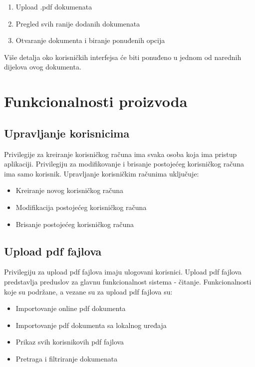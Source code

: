 \begin{enumerate}
    \item Upload .pdf dokumenata
    \item Pregled svih ranije dodanih dokumenata
    \item Otvaranje dokumenta i biranje ponuđenih opcija
\end{enumerate}

Više detalja oko korisničkih interfejsa će biti ponuđeno u jednom od narednih dijelova ovog dokumenta.


\section{Funkcionalnosti proizvoda}
\subsection{Upravljanje korisnicima}
Privilegije za kreiranje korisničkog računa ima svaka osoba koja ima pristup aplikaciji. Privilegiju za modifikovanje i brisanje postojećeg korisničkog računa ima samo korisnik. Upravljanje korisničkim računima uključuje:
\begin{itemize}
  \item Kreiranje novog korisničkog računa
  \item Modifikacija postojećeg korisničkog računa
  \item Brisanje postojećeg korisničkog računa
\end{itemize}

\subsection{Upload pdf fajlova}
Privilegiju za upload pdf fajlova imaju ulogovani korisnici. Upload pdf fajlova predstavlja preduslov za glavnu funkcionalnost sistema - čitanje. Funkcionalnosti koje su podržane, a vezane su za upload pdf fajlova su:
\begin{itemize}
  \item Importovanje online pdf dokumenta
  \item Importovanje pdf dokumenta sa lokalnog uređaja
  \item Prikaz svih korisnikovih pdf fajlova
  \item Pretraga i filtriranje dokumenata
\end{itemize}

